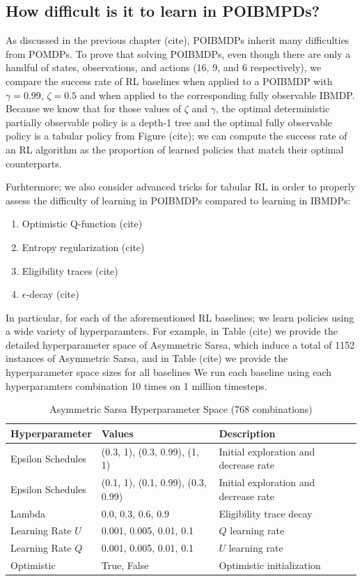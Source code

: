 \subsection{How difficult is it to learn in POIBMPDs?}

As discussed in the previous chapter (cite), POIBMDPs inherit many difficulties from POMDPs.
To prove that solving POIBMDPs, even though there are only a handful of states, observations, and actions (16, 9, and 6 respectively), we compare the success rate of RL baselines when applied to a POIBMDP with $\gamma=0.99$, $\zeta=0.5$ and when applied to the corresponding fully observable IBMDP.
Because we know that for those values of $\zeta$ and $\gamma$, the optimal deterministic partially observable policy is a depth-1 tree and the optimal fully observable policy is a tabular policy from Figure (cite); we can compute the success rate of an RL algorithm as the proportion of learned policies that match their optimal counterparts.

Furhtermore; we also consider advanced tricks for tabular RL in order to properly assess the difficulty of learning in POIBMDPs compared to learning in IBMDPs:
\begin{enumerate}
    \item Optimistic Q-function (cite)
    \item Entropy regularization (cite)
    \item Eligibility traces (cite)
    \item $\epsilon$-decay (cite)
\end{enumerate}
In particular, for each of the aforementioned RL baselines; we learn policies using a wide variety of hyperparamters.
For example, in Table (cite) we provide the detailed hyperparameter space of Asymmetric Sarsa, which induce a total of 1152 instances of Asymmetric Sarsa, and in Table (cite) we provide the hyperparameter space sizes for all baselines 
We run each baseline using each hyperparamters combination 10 times on 1 million timesteps.

\begin{table}[h]
\centering
\caption{Asymmetric Sarsa Hyperparameter Space (768 combinations)}
\begin{tabular}{lll}
\toprule
\textbf{Hyperparameter} & \textbf{Values} & \textbf{Description} \\
\midrule
Epsilon Schedules & (0.3, 1), (0.3, 0.99), (1, 1) & Initial exploration and decrease rate \\
Epsilon Schedules & (0.1, 1), (0.1, 0.99), (0.3, 0.99) & Initial exploration and decrease rate \\
Lambda & 0.0, 0.3, 0.6, 0.9 & Eligibility trace decay \\
Learning Rate $U$ & 0.001, 0.005, 0.01, 0.1 & $Q$ learning rate \\
Learning Rate $Q$ & 0.001, 0.005, 0.01, 0.1 & $U$ learning rate \\
Optimistic & True, False & Optimistic initialization \\
\bottomrule
\end{tabular}
\end{table}

